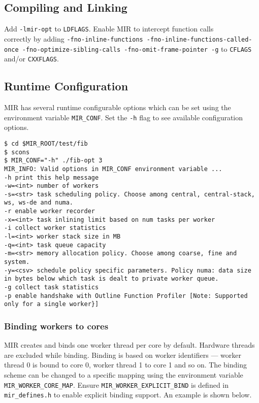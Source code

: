 \documentclass[11pt,a4paper]{article}
\begin{document}
\subsection{Compiling and Linking}\label{compiling-and-linking}

Add \texttt{-lmir-opt} to \texttt{LDFLAGS}. Enable MIR to intercept function calls\\correctly by adding \texttt{{\footnotesize -fno-inline-functions -fno-inline-functions-called-once -fno-optimize-sibling-calls -fno-omit-frame-pointer -g}}  to \texttt{CFLAGS} and/or \texttt{CXXFLAGS}.

\subsection{Runtime Configuration}\label{runtime-configuration}

MIR has several runtime configurable options which can be set using the environment variable \texttt{MIR\_CONF}. Set the \texttt{-h} flag to see available configuration options.

\begin{lstlisting}[style=MyInputStyle]
$ cd $MIR_ROOT/test/fib
$ scons 
$ MIR_CONF="-h" ./fib-opt 3
MIR_INFO: Valid options in MIR_CONF environment variable ...
-h print this help message
-w=<int> number of workers
-s=<str> task scheduling policy. Choose among central, central-stack, ws, ws-de and numa.
-r enable worker recorder
-x=<int> task inlining limit based on num tasks per worker
-i collect worker statistics
-l=<int> worker stack size in MB
-q=<int> task queue capacity
-m=<str> memory allocation policy. Choose among coarse, fine and system.
-y=<csv> schedule policy specific parameters. Policy numa: data size in bytes below which task is dealt to private worker queue.
-g collect task statistics
-p enable handshake with Outline Function Profiler [Note: Supported only for a single worker}]
\end{lstlisting}

\subsubsection{Binding workers to cores}\label{binding-workers-to-cores}

MIR creates and binds one worker thread per core by default. Hardware threads are excluded while binding. Binding is based on worker identifiers --- worker thread 0 is bound to core 0, worker thread 1 to core 1 and so on. The binding scheme can be changed to a specific mapping using the environment variable \texttt{MIR\_WORKER\_CORE\_MAP}. Ensure \texttt{MIR\_WORKER\_EXPLICIT\_BIND} is defined in \texttt{mir\_defines.h} to enable explicit binding support. An example is shown below.
\end{document}
